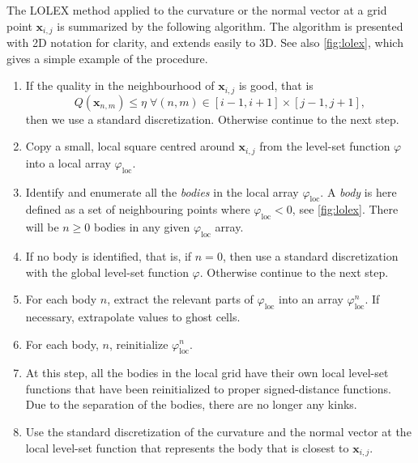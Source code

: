 \documentclass[11pt,b5paper,DIV=calc,BCOR1.3cm,headings=small,%
               footinclude=false,headsepline]{scrbook}
\newcommand*{\vct}[1]{\ensuremath{\boldsymbol{#1}}}
\begin{document}
The LOLEX method applied to the curvature or the normal vector at a grid point
$\vct x_{i,j}$ is summarized by the following algorithm.  The algorithm is
presented with 2D notation for clarity, and extends easily to 3D.  See also
\cref{fig:lolex}, which gives a simple example of the procedure.
\begin{enumerate}
  \item If the quality in the neighbourhood of $\vct x_{i,j}$ is good, that is
    \[
      Q(\vct{x}_{n,m}) \le \eta \; \forall (n,m) \in [i-1,i+1]\times[j-1,j+1],
    \]
    then we use a standard discretization.  Otherwise continue to the next
    step.
  \item Copy a small, local square centred around $\vct x_{i,j}$ from the
    level-set function $\varphi$ into a local array $\varphi_\text{loc}$.
  \item Identify and enumerate all the \emph{bodies} in the local array
    $\varphi_\text{loc}$.  A \emph{body} is here defined as a set of
    neighbouring points where $\varphi_\text{loc}<0$, see \cref{fig:lolex}.
    There will be $n\geq 0$ bodies in any given $\varphi_\text{loc}$ array.
  \item If no body is identified, that is, if $n=0$, then use a standard
    discretization with the global level-set function $\varphi$.  Otherwise
    continue to the next step.
  \item For each body $n$, extract the relevant parts of $\varphi_\text{loc}$
    into an array $\varphi_\text{loc}^n$.  If necessary, extrapolate values to
    ghost cells.
  \item For each body, $n$, reinitialize $\varphi_\text{loc}^n$.
  \item At this step, all the bodies in the local grid have their own
    local level-set functions that have been reinitialized to proper
    signed-distance functions.  Due to the separation of the bodies, there
    are no longer any kinks.
  \item Use the standard discretization of the curvature and the normal
    vector at the local level-set function that represents the body that is
    closest to $\vct x_{i,j}$.
\end{enumerate}
\end{document}
